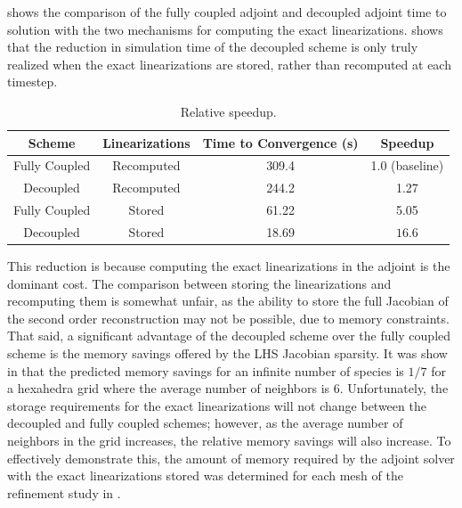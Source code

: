  shows the comparison of the fully coupled adjoint and 
decoupled adjoint time to solution with the two mechanisms for computing the
exact linearizations.   shows that the reduction in
simulation time of the decoupled scheme is only truly realized when the exact
linearizations are stored, rather than recomputed at each timestep. 
\begin{table}[h]
  \centering
  \caption{Relative speedup.}
  \begin{tabular}{c|c|c|c}
    Scheme & Linearizations & Time to Convergence (s) & Speedup \\
    \hline
    Fully Coupled & Recomputed  & 309.4 & 1.0 (baseline)\\
    Decoupled     & Recomputed  & 244.2 & 1.27 \\
    Fully Coupled & Stored      & 61.22 & 5.05 \\
    Decoupled     & Stored      & 18.69 & $\mathbf{16.6}$ \\
  \end{tabular}
  \label{tab:srp-rel-speedup}
\end{table}
This reduction is because computing the exact linearizations in the adjoint is
the dominant cost.  The comparison between storing the linearizations and
recomputing them is somewhat unfair, as the ability to store the full Jacobian
of the second order reconstruction may not be possible, due to memory
constraints.  That said, a significant advantage of the decoupled scheme over
the fully coupled scheme is the memory savings offered by the LHS Jacobian
sparsity. It was show in  that the
predicted memory savings for an infinite number of species is $1/7$ for a
hexahedra grid where the average number of neighbors is 6.  Unfortunately, the
storage requirements for the exact linearizations will not change between the
decoupled and fully coupled schemes; however, as the average number of neighbors
in the grid increases, the relative memory savings will also increase.  To
effectively demonstrate this, the amount of memory required by the adjoint
solver with the exact linearizations stored was determined for each mesh of the
refinement study in .
